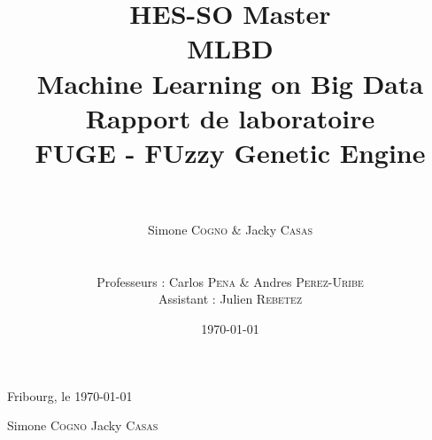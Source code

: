 \documentclass[a4paper, 12pt]{report}
\title{\huge{HES-SO Master} \\ \Huge{\textbf{\textsc{MLBD}}} \\
\LARGE{Machine Learning on Big Data} \\
\vspace{2cm} \huge{\textbf{Rapport de laboratoire}} \\ 
\huge{FUGE - FUzzy Genetic Engine}}
\author{\\ \\ Simone \textsc{Cogno} \& Jacky \textsc{Casas} \\
\\ \\
Professeurs : Carlos \textsc{Pena} \& Andres \textsc{Perez-Uribe} \\
Assistant : Julien \textsc{Rebetez}}
\date{\today}
\begin{document}
\maketitle %
\newpage

%

%
%
%


\vspace{3cm}
Fribourg, le \today

\vspace{1cm}

\hspace{2cm} Simone \textsc{Cogno} \hspace{4cm} Jacky \textsc{Casas}

\vspace{2cm}


%
\end{document}
